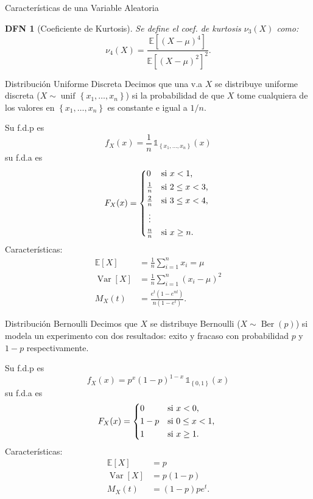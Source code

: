 \documentclass[a4paper]{article}
\newtheorem{definition}{DFN}
\theoremstyle{mytheoremstyle}
\newcommand{\E}{\mathbb{E}}
\newcommand{\1}{\mathds{1}}
\providecommand{\set}[1]{\left\{#1\right\}}
\DeclareMathOperator{\Var}{Var}
\DeclareMathOperator{\unif}{unif\!}
\DeclareMathOperator{\Ber}{Ber}
\begin{document}
\begin{multicols*}{3}
\begin{roundbox}{Características de una Variable Aleatoria}
    \begin{definition}[Coeficiente de Kurtosis] 
        Se define el coef. de kurtosis $\nu_3(X)$ como:
        \[
            \nu_4(X) = \frac{\E[(X-\mu)^{4}]}{\E[(X-\mu)^2]^2}.
        \]
    \end{definition}
\end{roundbox}

\pagebreak

\begin{roundbox}{Distribución Uniforme Discreta}
    Decimos que una v.a $X$ se distribuye uniforme discreta ($X \sim \unif\set{x_1, \dots , x_n}$) si la probabilidad de que $X$ tome cualquiera de los valores en $\set{x_1, \dots , x_n}$ es constante e igual a $1/n$.

    Su f.d.p es 
    \[
        f_X (x) = \frac{1}{n} \, \1_{\set{x_1, \dots, x_n}}(x)
    \]
    su f.d.a es 
    \[
        F_X (x) =
        \begin{cases*}
            0 & si  $x < 1$, \\
            \frac{1}{n} & si $2 \leq x < 3$, \\
            \frac{2}{n} & si $3 \leq x < 4$, \\
            \vdotswithin{\frac{2}{n}} \\
            \frac{n}{n} & si $x \geq n$. \\
        \end{cases*} 
    \]
    Características:
    \begin{align*}
        \E[X] &= \frac{1}{n} \sum_{i=1}^{n} x_i = \mu\\
        \Var[X] &= \frac{1}{n} \sum_{i=1}^{n} (x_i - \mu)^{2} \\
        M_X(t) &= \frac{e^t(1-e^{nt})}{n(1-e^t)} .
    \end{align*}
\end{roundbox}

\begin{roundbox}{Distribución Bernoulli}
    Decimos que $X$ se distribuye Bernoulli ($X \sim \Ber(p)$) si modela un experimento con dos resultados: exito y fracaso con probabilidad $p$ y $1-p$ respectivamente. 

    Su f.d.p es 
    \[
        f_X(x) = p^x (1-p)^{1-x} \, \1_{\set{0,1}}(x)
    \]
    su f.d.a es
    \[
        F_X (x) = 
       \begin{cases*}
           0 &  si $x < 0$, \\
           1-p & si $0 \leq x < 1$, \\
           1 & si $x \geq 1$.
       \end{cases*}   
    \]
    Características:
    \begin{align*}
        \E[X] &= p \\
        \Var[X] &= p(1-p) \\
        M_X(t) &= (1-p) pe^t.
    \end{align*}
\end{roundbox}


\end{multicols*}
\end{document}
